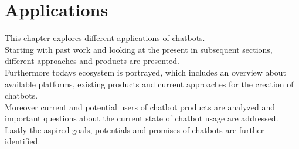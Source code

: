 \chapter{Applications}

This chapter explores different applications of chatbots.
\\
Starting with past work and looking at the present in subsequent sections,
different approaches and products are presented.
\\
Furthermore todays ecosystem is portrayed,
which includes an overview about available platforms,
existing products
and current approaches for the creation of chatbots.
\\
Moreover current and potential users of chatbot products are analyzed
and important questions about the current state of chatbot usage are addressed.
\\
Lastly the aspired goals, potentials and promises of chatbots are further identified.
